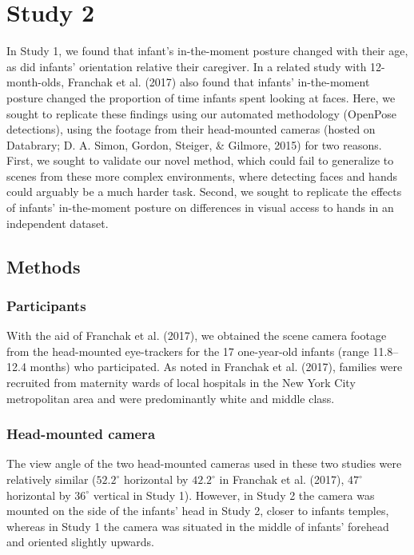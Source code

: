 \documentclass[english,man]{apa6}
\begin{document}
\section{Study 2}\label{study-2}

In Study 1, we found that infant's in-the-moment posture changed with
their age, as did infants' orientation relative their caregiver. In a
related study with 12-month-olds, Franchak et al. (2017) also found that
infants' in-the-moment posture changed the proportion of time infants
spent looking at faces. Here, we sought to replicate these findings
using our automated methodology (OpenPose detections), using the footage
from their head-mounted cameras (hosted on Databrary; D. A. Simon,
Gordon, Steiger, \& Gilmore, 2015) for two reasons. First, we sought to
validate our novel method, which could fail to generalize to scenes from
these more complex environments, where detecting faces and hands could
arguably be a much harder task. Second, we sought to replicate the
effects of infants' in-the-moment posture on differences in visual
access to hands in an independent dataset.

\subsection{Methods}\label{methods-1}

\subsubsection{Participants}\label{participants-1}

With the aid of Franchak et al. (2017), we obtained the scene camera
footage from the head-mounted eye-trackers for the 17 one-year-old
infants (range 11.8--12.4 months) who participated. As noted in Franchak
et al. (2017), families were recruited from maternity wards of local
hospitals in the New York City metropolitan area and were predominantly
white and middle class.

\subsubsection{Head-mounted camera}\label{head-mounted-camera-1}

The view angle of the two head-mounted cameras used in these two studies
were relatively similar (\(52.2^{\circ}\) horizontal by \(42.2^{\circ}\)
in Franchak et al. (2017), \(47^{\circ}\) horizontal by \(36^{\circ}\)
vertical in Study 1). However, in Study 2 the camera was mounted on the
side of the infants' head in Study 2, closer to infants temples, whereas
in Study 1 the camera was situated in the middle of infants' forehead
and oriented slightly upwards.
\end{document}
